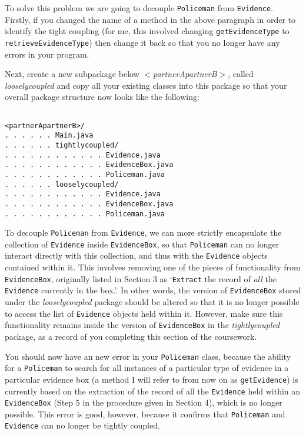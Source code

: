 \documentclass[11pt]{article}
\begin{document}
To solve this problem we are going to decouple \texttt{Policeman} from \texttt{Evidence}. Firstly, if you changed the name of a method in the above paragraph in order to identify the tight coupling (for me, this involved changing \texttt{getEvidenceType} to \texttt{retrieveEvidenceType}) then change it back so that you no longer have any errors in your program. 

Next, create a new subpackage below $<$\emph{partnerApartnerB}$>$, called \emph{looselycoupled} and copy all your existing classes into this package so that your overall package structure now looks like the following:

\vspace{-8mm}

\begin{verbatim}

<partnerApartnerB>/
. . . . . . Main.java
. . . . . . tightlycoupled/
. . . . . . . . . . . . Evidence.java
. . . . . . . . . . . . EvidenceBox.java
. . . . . . . . . . . . Policeman.java
. . . . . . looselycoupled/
. . . . . . . . . . . . Evidence.java
. . . . . . . . . . . . EvidenceBox.java
. . . . . . . . . . . . Policeman.java

\end{verbatim}

\vspace{-8mm}

To decouple \texttt{Policeman} from \texttt{Evidence}, we can more strictly encapsulate the collection of  \texttt{Evidence} inside \texttt{EvidenceBox}, so that \texttt{Policeman} can no longer interact directly with this collection, and thus with the \texttt{Evidence} objects contained within it. This involves removing one of the pieces of functionality from \texttt{EvidenceBox}, originally listed in Section 3 as `\texttt{Extract} the record of \emph{all} the \texttt{Evidence} currently in the box.'. In other words, the version of \texttt{EvidenceBox} stored under the \emph{looselycoupled} package should be altered so that it is no longer possible to access the list of \texttt{Evidence} objects held within it. However, make sure this functionality remains inside the version of \texttt{EvidenceBox} in the \emph{tightlycoupled} package, as a record of you completing this section of the coursework.

You should now have an new error in your \texttt{Policeman} class, because the ability for a \texttt{Policeman} to search for all instances of a particular type of evidence in a particular evidence box (a method I will refer to from now on as \texttt{getEvidence}) is currently based on the extraction of the record of all the \texttt{Evidence} held within an \texttt{EvidenceBox} (Step 5 in the procedure given in Section 4), which is no longer possible. This error is good, however, because it confirms that \texttt{Policeman} and \texttt{Evidence} can no longer be tightly coupled.
\end{document}
